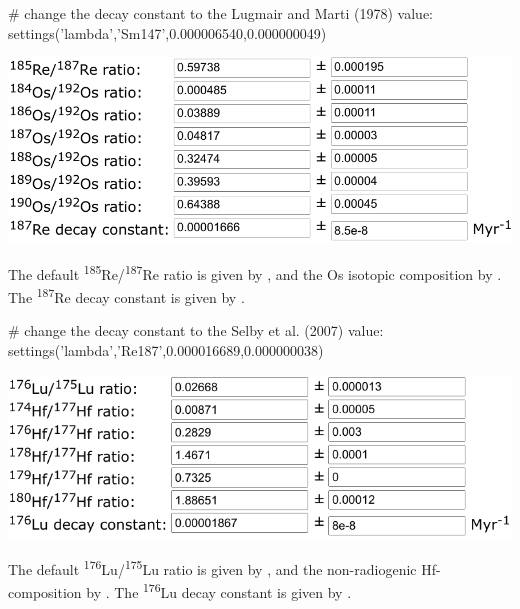\begin{refsection}
\begin{script}
# change the decay constant to the Lugmair and Marti (1978) value:
settings('lambda','Sm147',0.000006540,0.000000049)
\end{script}

\noindent\begin{minipage}[t]{.6\linewidth}
\strut\vspace*{-\baselineskip}\newline
\includegraphics[width=\linewidth]{../figures/ReOsLambda.png}
\end{minipage}
\begin{minipage}[t]{.4\linewidth}
The default \textsuperscript{185}Re/\textsuperscript{187}Re ratio is
given by \citet{gramlich1973}, and the Os isotopic composition by
\citet{volkening1991}. The \textsuperscript{187}Re decay constant is
given by \citet{smoliar1996}.\\
\end{minipage}

\begin{script}
# change the decay constant to the Selby et al. (2007) value:
settings('lambda','Re187',0.000016689,0.000000038)
\end{script}

\noindent\begin{minipage}[t]{.6\linewidth}
\strut\vspace*{-\baselineskip}\newline
\includegraphics[width=\linewidth]{../figures/LuHfLambda.png}
\end{minipage}
\begin{minipage}[t]{.4\linewidth}
The default \textsuperscript{176}Lu/\textsuperscript{175}Lu ratio is
given by \citet{delaeter2006}, and the non-radiogenic Hf-composition
by \citet{patchett1983}. The \textsuperscript{176}Lu decay constant is
given by \citet{soderlund2004}.
\end{minipage}


\end{refsection}
